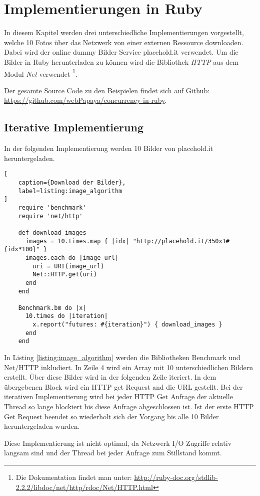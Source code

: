\section{Implementierungen in Ruby}
\label{section:implementation}

In diesem Kapitel werden drei unterschiedliche Implementierungen vorgestellt, welche 10 Fotos über das Netzwerk von einer externen Ressource downloaden. Dabei wird der online dummy Bilder Service placehold.it verwendet. Um die Bilder in Ruby herunterladen zu können wird die Bibliothek \emph{HTTP} aus dem Modul \emph{Net} verwendet \footnote{Die Dokumentation findet man unter: \url{http://ruby-doc.org/stdlib-2.2.2/libdoc/net/http/rdoc/Net/HTTP.html}}.

Der gesamte Source Code zu den Beispielen findet sich auf Github: \url{https://github.com/webPapaya/concurrency-in-ruby}.


\subsection{Iterative Implementierung}

In der folgenden Implementierung werden 10 Bilder von placehold.it heruntergeladen.

\begin{lstlisting}[
	caption={Download der Bilder},
	label=listing:image_algorithm
]
	require 'benchmark'
	require 'net/http'

	def download_images
	  images = 10.times.map { |idx| "http://placehold.it/350x1#{idx*100}" }
	  images.each do |image_url|
	    uri = URI(image_url)
	    Net::HTTP.get(uri)
	  end
	end

	Benchmark.bm do |x|
	  10.times do |iteration|
	    x.report("futures: #{iteration}") { download_images }
	  end
	end
\end{lstlisting}

In Listing \ref{listing:image_algorithm} werden die Bibliotheken Benchmark und Net/HTTP inkludiert. In Zeile 4 wird ein Array mit 10 unterschiedlichen Bildern erstellt. Über diese Bilder wird in der folgenden Zeile iteriert.  In dem übergebenen Block wird ein HTTP get Request and die URL gestellt. Bei der iterativen Implementierung wird bei jeder HTTP Get Anfrage der aktuelle Thread so lange blockiert bis diese Anfrage abgeschlossen ist. Ist der erste HTTP Get Request beendet so wiederholt sich der Vorgang bis alle 10 Bilder heruntergeladen wurden. 

Diese Implementierung ist nicht optimal, da Netzwerk I/O Zugriffe relativ langsam sind und der Thread bei jeder Anfrage zum Stillstand kommt.

